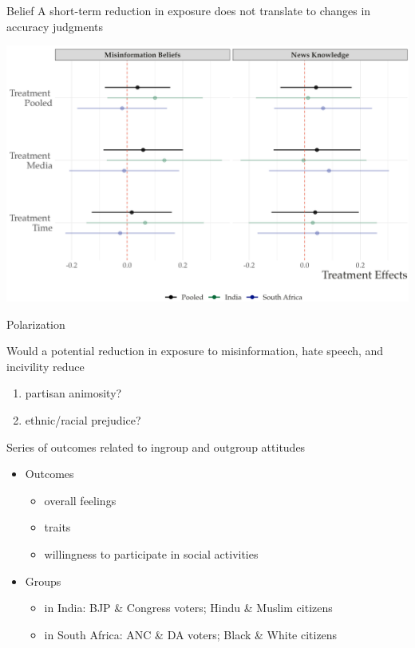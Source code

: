 \documentclass[usenames,dvipsnames,t]{beamer}
\begin{document}
\begin{frame}{Belief} \small  
A short-term reduction in exposure does not translate to changes in accuracy judgments
\begin{center}
\includegraphics[scale=.37]{h2_itt}
\end{center}

\end{frame}


\begin{frame}{Polarization} \small  

Would a potential reduction in exposure to misinformation, hate speech, and incivility reduce
\begin{enumerate}
\item partisan animosity?
\item ethnic/racial prejudice?
\end{enumerate}

\pause
\vspace{.6cm}
Series of outcomes related to ingroup and outgroup attitudes
	\begin{itemize}
	\item Outcomes \begin{itemize} \item overall feelings \item traits \item willingness to participate in social activities \end{itemize}
	\item Groups
	\begin{itemize}
	\item in India: BJP \& Congress voters; Hindu \& Muslim citizens
	\item in South Africa: ANC \& DA voters; Black \& White citizens
	\end{itemize}
	\end{itemize}

\end{frame}
\end{document}
